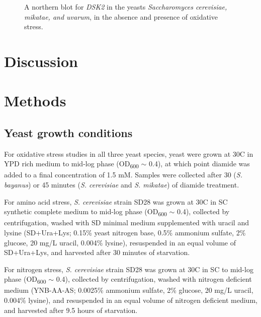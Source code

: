 \begin{figure}
    \caption[A northern blot for \textit{DSK2} in the yeasts \textit{Saccharomyces cerevisiae, mikatae, and uvarum}, in the absence and presence of oxidative stress.]{A northern blot for \textit{DSK2} in the yeasts \textit{Saccharomyces cerevisiae, mikatae, and uvarum}, in the absence and presence of oxidative stress.}
\end{figure}


\section{Discussion}

\lipsum[1]

\section{Methods}

\subsection{Yeast growth conditions}
\label{subsec:stress_growth_conditions}

For oxidative stress studies in all three yeast species, yeast were grown at 30\textdegree C in YPD rich medium to mid-log phase (OD\textsubscript{600} $\sim$ 0.4), at which point diamide was added to a final concentration of 1.5 mM.
Samples were collected after 30 (\textit{S. bayanus}) or 45 minutes (\textit{S. cerevisiae} and \textit{S. mikatae}) of diamide treatment.

For amino acid stress, \textit{S. cerevisiae} strain SD28 was grown at 30\textdegree C in SC synthetic complete medium to mid-log phase (OD\textsubscript{600} $\sim$ 0.4), collected by centrifugation, washed with SD minimal medium supplemented with uracil and lysine (SD+Ura+Lys; 0.15\% yeast nitrogen base, 0.5\% ammonium sulfate, 2\% glucose, 20 mg/L uracil, 0.004\% lysine), resuspended in an equal volume of SD+Ura+Lys, and harvested after 30 minutes of starvation.

For nitrogen stress, \textit{S. cerevisiae} strain SD28 was grown at 30\textdegree C in SC to mid-log phase (OD\textsubscript{600} $\sim$ 0.4), collected by centrifugation, washed with nitrogen deficient medium (YNB-AA-AS; 0.0025\% ammonium sulfate, 2\% glucose, 20 mg/L uracil, 0.004\% lysine), and resuspended in an equal volume of nitrogen deficient medium, and harvested after 9.5 hours of starvation.

